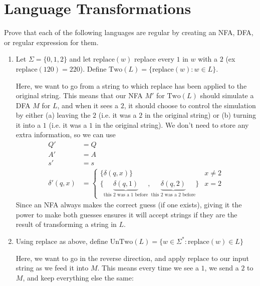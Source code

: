 \documentclass[fleqn]{article}
\begin{document}
\section{Language Transformations}
Prove that each of the following languages are regular by creating an NFA, DFA, or regular expression for them.
\begin{enumerate}
    \item Let $\Sigma = \{0,1,2\}$ and let $\text{replace}(w)$ replace every $1$
    in $w$ with a $2$ (ex $\text{replace}(120) = 220$). Define $\text{Two}(L) = \{\text{replace}(w) : w \in L\}$.
    \begin{answer}
        Here, we want to go from a string to which $\text{replace}$ has been applied to the original string. This means that our NFA $M'$ for $\text{Two}(L)$ should simulate a DFA $M$ for $L$, and when it sees a $2$, it should choose to control the simulation by either (a) leaving the $2$ (i.e. it was a $2$ in the original string) or (b) turning it into a $1$ (i.e. it was a $1$ in the original string). We don't need to store any extra information, so we can use
        \[
            \begin{aligned}
                Q' &= Q \\
                A' &= A \\
                s' &= s \\
                \delta'(q, x) &= \begin{cases}
                    \{\delta(q,x)\} & x \neq 2 \\
                    \{\underbrace{\delta(q,1)}_{\text{this $2$ was a $1$ before}},\underbrace{\delta(q,2)}_{\text{this $2$ was a $2$ before}}\} & x = 2
                \end{cases}
            \end{aligned}
        \]
        Since an NFA always makes the correct guess (if one exists), giving it the power to make both guesses ensures it will accept strings if they are the result of transforming a string in $L$.
    \end{answer}
    \item Using $\text{replace}$ as above, define $\text{UnTwo}(L) = \{w \in \Sigma^*: \text{replace}(w) \in L\}$
    \begin{answer}
        Here, we want to go in the reverse direction, and apply $\text{replace}$ to our input string as we feed it into $M$. This means every time we see a $1$, we send a $2$ to $M$, and keep everything else the same:
        \[
            \begin{aligned}

\end{aligned}\]
\end{answer}
\end{enumerate}
\end{document}
